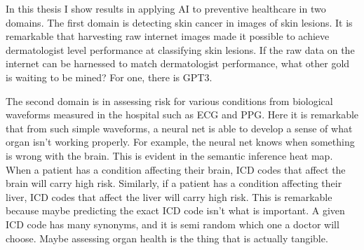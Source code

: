 In this thesis I show results in applying AI to preventive healthcare in two domains.  The first domain is detecting skin cancer in images of skin lesions.  It is remarkable that harvesting raw internet images made it possible to achieve dermatologist level performance at classifying skin lesions.  If the raw data on the internet can be harnessed to match dermatologist performance, what other gold is waiting to be mined?  For one, there is GPT3.  

The second domain is in assessing risk for various conditions from biological waveforms measured in the hospital such as ECG and PPG.  Here it is remarkable that from such simple waveforms, a neural net is able to develop a sense of what organ isn't working properly.  For example, the neural net knows when something is wrong with the brain.  This is evident in the semantic inference heat map.  When a patient has a condition affecting their brain, ICD codes that affect the brain will carry high risk.  Similarly, if a patient has a condition affecting their liver, ICD codes that affect the liver will carry high risk.  This is remarkable because maybe predicting the exact ICD code isn't what is important.  A given ICD code has many synonyms, and it is semi random which one a doctor will choose.  Maybe assessing organ health is the thing that is actually tangible.